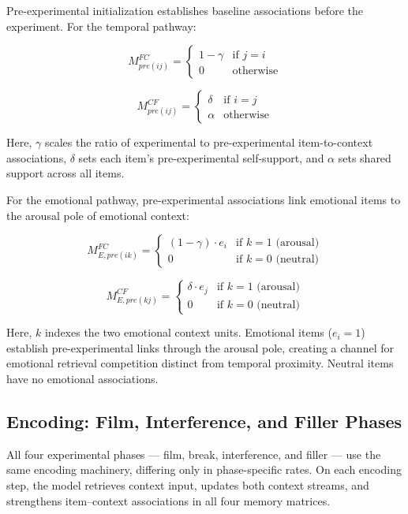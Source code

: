 \documentclass[
  man,
  floatsintext,
  longtable,
  nolmodern,
  notxfonts,
  notimes,
  draftfirst,
  colorlinks=true,linkcolor=blue,citecolor=blue,urlcolor=blue]{apa7}
\begin{document}
Pre-experimental initialization establishes baseline associations before
the experiment. For the temporal pathway:

\[
M^{FC}_{pre(ij)} =
\begin{cases}
1 - \gamma & \text{if } j = i \\
0 & \text{otherwise}
\end{cases}
\]

\[
M^{CF}_{pre(ij)} =
\begin{cases}
\delta & \text{if } i = j \\
\alpha & \text{otherwise}
\end{cases}
\]

Here, \(\gamma\) scales the ratio of experimental to pre-experimental
item-to-context associations, \(\delta\) sets each item's
pre-experimental self-support, and \(\alpha\) sets shared support across
all items.

For the emotional pathway, pre-experimental associations link emotional
items to the arousal pole of emotional context:

\[
M^{FC}_{E,pre(ik)} =
\begin{cases}
(1 - \gamma) \cdot e_i & \text{if } k = 1 \text{ (arousal)} \\
0 & \text{if } k = 0 \text{ (neutral)}
\end{cases}
\]

\[
M^{CF}_{E,pre(kj)} =
\begin{cases}
\delta \cdot e_j & \text{if } k = 1 \text{ (arousal)} \\
0 & \text{if } k = 0 \text{ (neutral)}
\end{cases}
\]

Here, \(k\) indexes the two emotional context units. Emotional items
(\(e_i = 1\)) establish pre-experimental links through the arousal pole,
creating a channel for emotional retrieval competition distinct from
temporal proximity. Neutral items have no emotional associations.

\subsection{Encoding: Film, Interference, and Filler
Phases}\label{encoding-film-interference-and-filler-phases}

All four experimental phases --- film, break, interference, and filler
--- use the same encoding machinery, differing only in phase-specific
rates. On each encoding step, the model retrieves context input, updates
both context streams, and strengthens item--context associations in all
four memory matrices.
\end{document}

